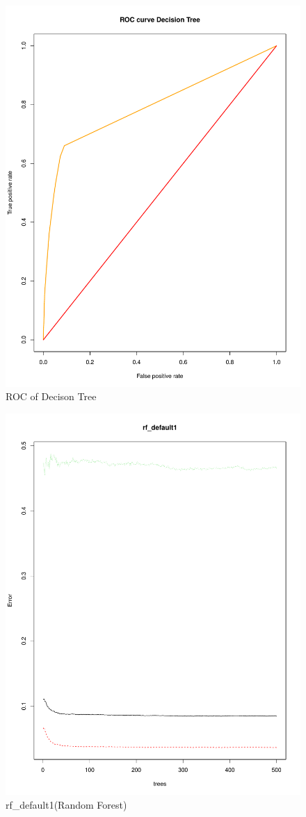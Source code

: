 \documentclass[12pt, a4paper, bibliography=totoc, english]{scrartcl}
\begin{document}
\begin{figure}
	\centering
	\includegraphics[width=0.7\linewidth]{ROC_dt}
	\caption{ROC of Decison Tree}
	\label{fig:rocdt}
\end{figure}


\begin{figure}
	\centering
	\includegraphics[width=0.7\linewidth]{RF1}
	\caption{rf\_default1(Random Forest)}
	\label{fig:rf1}
\end{figure}
\end{document}

